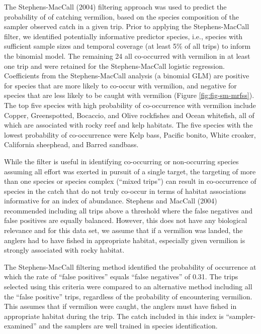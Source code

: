 \documentclass[
  english,
  a4paper,
]{article}
\begin{document}
The Stephens-MacCall (2004) filtering approach was used to predict the
probability of of catching vermilion, based
on the species composition of the sampler observed catch in a given trip. Prior
to applying the Stephens-MacCall filter, we identified potentially informative
predictor species, i.e., species with sufficient sample sizes and temporal coverage
(at least 5\% of all trips) to inform the binomial model. The remaining
24 all co-occurred with vermilion in at least one trip
and were retained for the Stephens-MacCall logistic regression. Coefficients
from the Stephens-MacCall analysis (a binomial GLM) are positive
for species that are more likely to co-occur with vermilion,
and negative for species that are less likely to be caught with vermilion
(Figure \ref{fig:fig-sm-mrfss}).
The top five species with high probability of co-occurrence with vermilion include
Copper, Greenspotted, Bocaccio, and Olive rockfishes and Ocean whitefish, all of which are associated with rocky reef and kelp
habitats. The five species with the lowest probability of co-occurrence were
Kelp bass, Pacific bonito, White croaker, California sheephead, and Barred sandbass.

While the filter is useful in identifying co-occurring or non-occurring species
assuming all effort was exerted in pursuit of a single target, the targeting of
more than one species or species complex (``mixed trips'') can result in co-occurrence of species in the catch
that do not truly co-occur in terms of habitat
associations informative for an index of abundance. Stephens and MacCall
(2004) recommended including all trips above a threshold where the
false negatives and false positives are equally balanced. However, this does
not have any biological relevance and for this data set, we assume that if a
vermilion was landed, the anglers had to have fished in appropriate habitat,
especially given vermilion is strongly associated with rocky habitat.

The Stephens-MacCall filtering method identified the probability of occurrence
at which the rate of ``false
positives'' equals ``false negatives'' of 0.31. The
trips selected using this criteria were compared to an alternative method
including all the ``false positive'' trips, regardless of the probability of
encountering vermilion.
This assumes that if vermilion were caught, the anglers must have fished in
appropriate habitat during the trip. The catch included in this index is
``sampler-examined'' and the samplers are well trained in species identification.
\end{document}
